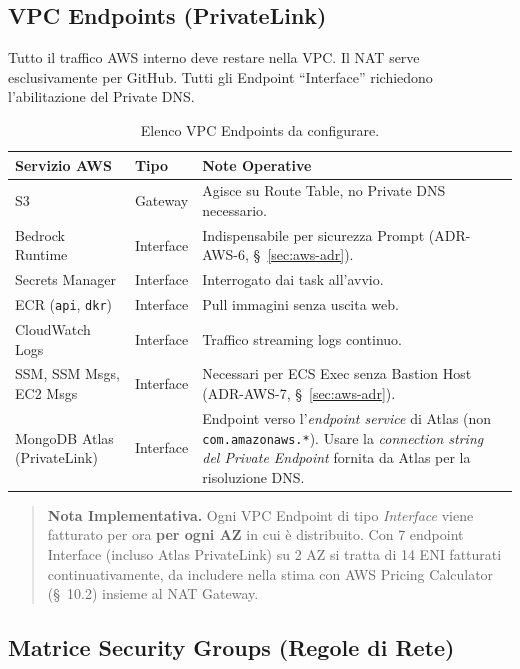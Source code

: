 \documentclass[11pt,a4paper]{article}
\begin{document}
\subsection{VPC Endpoints (PrivateLink)}

Tutto il traffico AWS interno deve restare nella VPC. Il NAT serve esclusivamente per GitHub. Tutti gli Endpoint ``Interface'' richiedono l'abilitazione del Private DNS.

\begin{table}[H]
\centering
\caption{Elenco VPC Endpoints da configurare.}
\label{tab:aws-vpce}
\vspace{2mm}
\renewcommand{\arraystretch}{1.2}
\begin{tabularx}{\textwidth}{|l|l|X|}
\hline
\textbf{Servizio AWS} & \textbf{Tipo} & \textbf{Note Operative} \\ \hline
S3 & Gateway & Agisce su Route Table, no Private DNS necessario. \\ \hline
Bedrock Runtime & Interface & Indispensabile per sicurezza Prompt (ADR-AWS-6, \S~\ref{sec:aws-adr}). \\ \hline
Secrets Manager & Interface & Interrogato dai task all'avvio. \\ \hline
ECR (\texttt{api}, \texttt{dkr}) & Interface & Pull immagini senza uscita web. \\ \hline
CloudWatch Logs & Interface & Traffico streaming logs continuo. \\ \hline
SSM, SSM Msgs, EC2 Msgs & Interface & Necessari per ECS Exec senza Bastion Host (ADR-AWS-7, \S~\ref{sec:aws-adr}). \\ \hline
MongoDB Atlas (PrivateLink) & Interface & Endpoint verso l'\emph{endpoint service} di Atlas (non \texttt{com.amazonaws.*}). Usare la \emph{connection string del Private Endpoint} fornita da Atlas per la risoluzione DNS. \\ \hline
\end{tabularx}
\end{table}

\begin{quote}
\textbf{Nota Implementativa.} Ogni VPC Endpoint di tipo \emph{Interface} viene fatturato per ora \textbf{per ogni AZ} in cui è distribuito. Con 7 endpoint Interface (incluso Atlas PrivateLink) su 2 AZ si tratta di 14 ENI fatturati continuativamente, da includere nella stima con AWS Pricing Calculator (\S~10.2) insieme al NAT Gateway.
\end{quote}

\subsection{Matrice Security Groups (Regole di Rete)}
\end{document}
